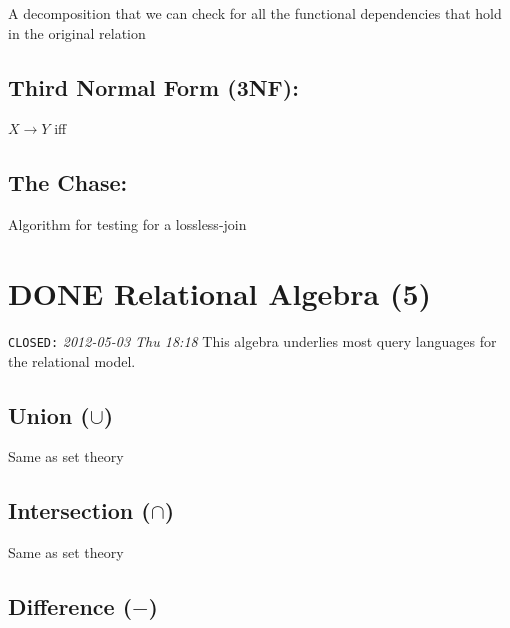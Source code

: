 \documentclass[11pt]{article}
\begin{document}
   A decomposition that we can check for all the functional
   dependencies that hold in the original relation
\subsection{Third Normal Form (3NF):}
\label{sec-3.9}

   $X \rightarrow Y$ iff
\subsection{The Chase:}
\label{sec-3.10}

   Algorithm for testing for a lossless-join
\section{\textbf{DONE} Relational Algebra (5)}
\label{sec-4}

  \texttt{CLOSED:} \textit{2012-05-03 Thu 18:18}\newline
  This algebra underlies most query languages for the relational model.
\subsection{Union ($\cup$)}
\label{sec-4.1}

   Same as set theory
\subsection{Intersection ($\cap$)}
\label{sec-4.2}

   Same as set theory
\subsection{Difference ($-$)}
\label{sec-4.3}
\end{document}
